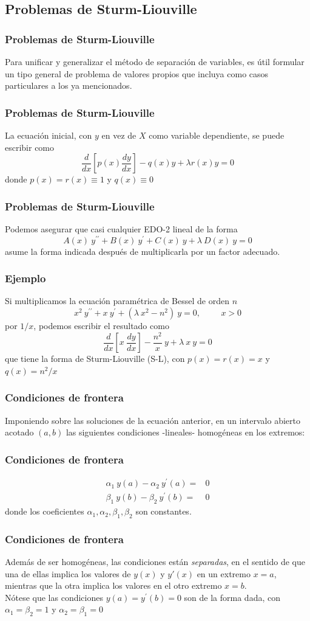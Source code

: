 \subsection{Problemas de Sturm-Liouville}
\begin{frame}
\frametitle{Problemas de Sturm-Liouville}
Para unificar y generalizar el método de separación de variables, es útil formular un tipo general de problema de valores propios que incluya como casos particulares a los ya mencionados.
\end{frame}
\begin{frame}
\frametitle{Problemas de Sturm-Liouville}
La ecuación inicial, con $y$ en vez de $X$ como variable dependiente, se puede escribir como
\[ \dfrac{d}{dx} \left[ p(x) \dfrac{dy}{dx} \right] - q(x) y + \lambda r(x) y = 0\]
donde $p(x)=r(x) \equiv 1$ y $q(x) \equiv 0$
\end{frame}
\begin{frame}
\frametitle{Problemas de Sturm-Liouville}
Podemos asegurar que casi cualquier EDO-2 lineal de la forma
\[ A(x) \: y^{\prime \prime} + B(x) \: y^{\prime} + C(x) \: y + \lambda \: D(x) \: y = 0\]
asume la forma indicada después de multiplicarla por un factor adecuado.
\end{frame}
\begin{frame}
\frametitle{Ejemplo}
Si multiplicamos la ecuación paramétrica de Bessel de orden $n$
\[ x^{2} \: y^{\prime \prime} + x \: y^{\prime} + (\lambda \: x^{2} - n^{2}) \: y = 0, \hspace{1cm} x > 0\]
por $1/x$, podemos escribir el resultado como
\[ \dfrac{d}{dx} \left[ x \: \dfrac{dy}{dx} \right] - \dfrac{n^{2}}{x} \: y + \lambda \: x \: y = 0\]
que tiene la forma de Sturm-Liouville (S-L), con $p(x) = r(x) = x$ y $q(x) = n^{2}/x$
\end{frame}
\begin{frame}
\frametitle{Condiciones de frontera}
Imponiendo sobre las soluciones de la ecuación anterior, en un intervalo abierto acotado $(a,b)$ las siguientes condiciones -lineales- homogéneas en los extremos:
\end{frame}
\begin{frame}
\frametitle{Condiciones de frontera}
\[ \begin{split}
\alpha_{1} \: y(a) - \alpha_{2} \: y^{\prime}(a) =& 0 \\
\beta_{1} \: y(b) - \beta_{2} \: y^{\prime}(b) =& 0
\end{split} \]
donde los coeficientes $\alpha_{1},\alpha_{2},\beta_{1},\beta_{2}$ son constantes. 
\end{frame}
\begin{frame}
\frametitle{Condiciones de frontera}
Además de ser homogéneas, las condiciones están \textit{separadas}, en el sentido de que una de ellas implica los valores de $y(x)$ y $y'(x)$ en un extremo $x=a$, mientras que la otra implica los valores en el otro extremo $x=b$.
\\
\bigskip
Nótese que las condiciones $y(a) = y^{\prime}(b) = 0$ son de la forma dada, con $\alpha_{1} = \beta_{2} = 1$ y $\alpha_{2} = \beta_{1} = 0$
\end{frame}
